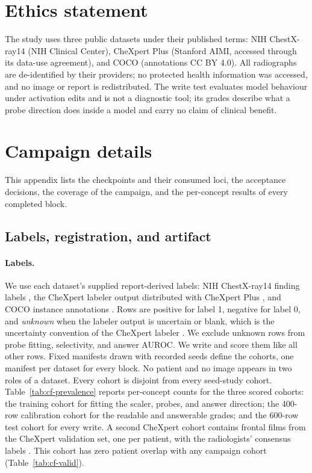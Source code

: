 \documentclass{article}
\begin{document}
\section*{Ethics statement}
The study uses three public datasets under their published terms: NIH ChestX-ray14 (NIH Clinical Center), CheXpert Plus (Stanford AIMI, accessed through its data-use agreement), and COCO (annotations CC BY 4.0). All radiographs are de-identified by their providers; no protected health information was accessed, and no image or report is redistributed. The write test evaluates model behaviour under activation edits and is not a diagnostic tool; its grades describe what a probe direction does inside a model and carry no claim of clinical benefit.



\clearpage
\appendix
\section{Campaign details}
\label{app:campaign}

This appendix lists the checkpoints and their consumed loci, the acceptance decisions, the coverage of the campaign, and the per-concept results of every completed block.

\subsection{Labels, registration, and artifact}
\label{app:cf-labels}

\paragraph{Labels.} We use each dataset's supplied report-derived labels: NIH ChestX-ray14 finding labels \citep{wang2017chestxray}, the CheXpert labeler output \citep{irvin2019chexpert} distributed with CheXpert Plus \citep{chambon2024chexpertplus}, and COCO instance annotations \citep{lin2014coco}. Rows are positive for label 1, negative for label 0, and \emph{unknown} when the labeler output is uncertain or blank, which is the uncertainty convention of the CheXpert labeler \citep{irvin2019chexpert}. We exclude unknown rows from probe fitting, selectivity, and answer AUROC. We write and score them like all other rows. Fixed manifests drawn with recorded seeds define the cohorts, one manifest per dataset for every block. No patient and no image appears in two roles of a dataset. Every cohort is disjoint from every seed-study cohort. Table~\ref{tab:cf-prevalence} reports per-concept counts for the three scored cohorts: the training cohort for fitting the scaler, probes, and answer direction; the 400-row calibration cohort for the readable and answerable grades; and the 600-row test cohort for every write. A second CheXpert cohort contains \cfValidRows{} frontal films from the CheXpert validation set, one per patient, with the radiologists' consensus labels \citep{irvin2019chexpert}. This cohort has zero patient overlap with any campaign cohort (Table~\ref{tab:cf-valid}).
\end{document}
